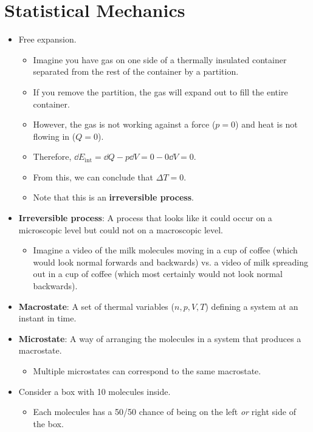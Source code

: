 \documentclass[../notes.tex]{subfiles}
\begin{document}
\section{Statistical Mechanics}
\begin{itemize}
    \item Free expansion.
    \begin{itemize}
        \item Imagine you have gas on one side of a thermally insulated container separated from the rest of the container by a partition.
        \item If you remove the partition, the gas will expand out to fill the entire container.
        \item However, the gas is not working against a force ($p=0$) and heat is not flowing in ($Q=0$).
        \item Therefore, $\dd{E_\text{int}}=\dd{Q}-p\dd{V}=0-0\dd{V}=0$.
        \item From this, we can conclude that $\Delta T=0$.
        \item Note that this is an \textbf{irreversible process}.
    \end{itemize}
    \item \textbf{Irreversible process}: A process that looks like it could occur on a microscopic level but could not on a macroscopic level.
    \begin{itemize}
        \item Imagine a video of the milk molecules moving in a cup of coffee (which would look normal forwards and backwards) vs. a video of milk spreading out in a cup of coffee (which most certainly would not look normal backwards).
    \end{itemize}
    \item \textbf{Macrostate}: A set of thermal variables ($n,p,V,T$) defining a system at an instant in time.
    \item \textbf{Microstate}: A way of arranging the molecules in a system that produces a macrostate.
    \begin{itemize}
        \item Multiple microstates can correspond to the same macrostate.
    \end{itemize}
    \item Consider a box with 10 molecules inside.
    \begin{itemize}
        \item Each molecules has a 50/50 chance of being on the left \emph{or} right side of the box.

\end{itemize}
\end{itemize}
\end{document}
